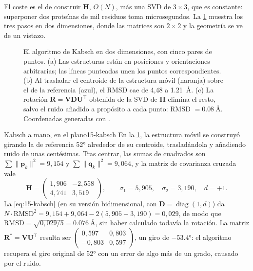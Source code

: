 \begin{simbolos}
\end{simbolos}

El coste es el de construir $\mathbf H$, $O(N)$, más una SVD de $3\times3$, que es constante: superponer dos proteínas de mil residuos toma microsegundos. La \cref{fig:15-kabsch} muestra los tres pasos en dos dimensiones, donde las matrices son $2\times2$ y la geometría se ve de un vistazo.

\begin{figure}[t]
\centering
\resizebox{\linewidth}{!}{}
\caption[Superposición de Kabsch]{El algoritmo de Kabsch en dos dimensiones, con cinco pares de puntos. (a) Las estructuras están en posiciones y orientaciones arbitrarias; las líneas punteadas unen los puntos correspondientes. (b) Al trasladar el centroide de la estructura móvil (naranja) sobre el de la referencia (azul), el RMSD cae de 4,48 a \SI{1,21}{\angstrom}. (c) La rotación $\mathbf R=\mathbf V\mathbf D\mathbf U^\top$ obtenida de la SVD de $\mathbf H$ elimina el resto, salvo el ruido añadido a propósito a cada punto: RMSD $=\SI{0,08}{\angstrom}$. Coordenadas generadas con .}
\label{fig:15-kabsch}
\end{figure}

\begin{ejemplo}{Kabsch a mano, en el plano}{15-kabsch}
En la \cref{fig:15-kabsch}, la estructura móvil se construyó girando la de referencia \ang{52} alrededor de su centroide, trasladándola y añadiendo ruido de unas centésimas. Tras centrar, las sumas de cuadrados son $\sum\lVert\mathbf p_k\rVert^2=9{,}154$ y $\sum\lVert\mathbf q_k\rVert^2=9{,}064$, y la matriz de covarianza cruzada vale
\[
\mathbf H=\begin{pmatrix}1{,}906 & -2{,}558\\ 4{,}741 & 3{,}519\end{pmatrix},
\qquad \sigma_1=5{,}905,\quad \sigma_2=3{,}190,\quad d=+1.
\]
La \cref{eq:15-kabsch} (en su versión bidimensional, con $\mathbf D=\operatorname{diag}(1,d)$) da $N\cdot\mathrm{RMSD}^2=9{,}154+9{,}064-2(5{,}905+3{,}190)=0{,}029$, de modo que $\mathrm{RMSD}=\sqrt{0{,}029/5}=\SI{0,076}{\angstrom}$, sin haber calculado todavía la rotación. La matriz $\mathbf R^\ast=\mathbf V\mathbf U^\top$ resulta ser $\left(\begin{smallmatrix}0{,}597 & 0{,}803\\ -0{,}803 & 0{,}597\end{smallmatrix}\right)$, un giro de $-\ang{53,4}$: el algoritmo recupera el giro original de \ang{52} con un error de algo más de un grado, causado por el ruido.
\end{ejemplo}

